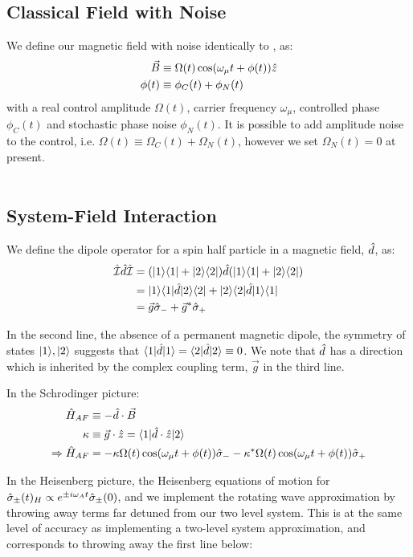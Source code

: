 \subsection{Classical Field with Noise}

We define our magnetic field with noise identically to \cite{soare}, as:
\begin{align}
\vec{B} &\equiv \Omega(t) \cos(\omega_\mu t + \phi(t)) \hat{z} \\
\phi(t) & \equiv \phi_C(t) + \phi_N(t)
\end{align}
with a real control amplitude $\Omega(t)$, carrier frequency $\omega_\mu$, controlled phase $\phi_C(t)$ and stochastic phase noise $\phi_N(t)$.  It is possible to add amplitude noise to the control, i.e. $\Omega(t) \equiv \Omega_C(t) + \Omega_N(t)$, however we set $\Omega_N(t) =0$ at present. 
\\
\\
\subsection{System-Field Interaction}

We define the dipole operator for a spin half particle in a magnetic field, $\hat{d}$, as:
\begin{align}
\hat{\mathcal{I}} \hat{d} \hat{\mathcal{I}} & = (| 1 \rangle\langle 1 | + | 2 \rangle\langle 2 |)\hat{d} (| 1 \rangle\langle 1 | + | 2 \rangle\langle 2 |) \\
& = | 1 \rangle\langle 1 |\hat{d}| 2 \rangle\langle 2 | +  | 2 \rangle\langle 2 |\hat{d}| 1 \rangle\langle 1 | \\
& = \vec{g}\hat{\sigma}_{-} + \vec{g}^*\hat{\sigma}_{+}
\end{align}

In the second line, the absence of a permanent magnetic dipole, the symmetry of states $| 1 \rangle, | 2 \rangle$ suggests that $\langle 1 |\hat{d}| 1 \rangle = \langle 2 |\hat{d}| 2 \rangle \equiv 0$. We note that $\hat{d}$ has a direction which is inherited by the complex coupling term, $\vec{g}$ in the third line.

In the Schrodinger picture:
\begin{align}
\hat{H}_{AF} &\equiv -\hat{d} \cdot \vec{B} \\
\kappa & \equiv \vec{g} \cdot \hat{z} = \langle 1 | \hat{d} \cdot \hat{z} | 2 \rangle \\
\Rightarrow \hat{H}_{AF} & = -\kappa \Omega(t)  \cos(\omega_\mu t + \phi(t)) \hat{\sigma}_{-} - \kappa^* \Omega(t)  \cos(\omega_\mu t + \phi(t)) \hat{\sigma}_{+}
\end{align} 
 
In the Heisenberg picture, the Heisenberg equations of motion for $\hat{\sigma}_{\pm}(t)_H \propto e^{\pm i \omega_A t} \hat{\sigma}_{\pm}(0)$, and we implement the rotating wave approximation by throwing away terms far detuned from our two level system. This is at the same level of accuracy as  implementing a two-level system approximation, and corresponds to throwing away the first line below:

